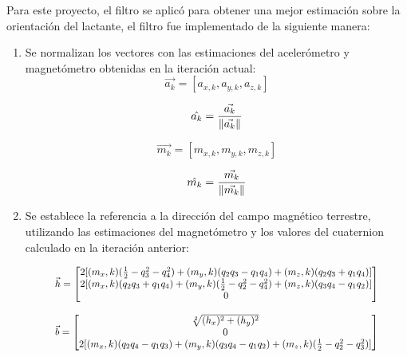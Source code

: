     Para este proyecto, el filtro se aplicó para obtener una mejor estimación sobre la orientación del lactante, el filtro fue implementado de la siguiente manera:

    \begin{enumerate}
        \item Se normalizan los vectores con las estimaciones del acelerómetro y magnetómetro obtenidas en la iteración actual:
        \begin{equation}
             \vec{a_k} = [a_{x,k}, a_{y,k}, a_{z,k}]  
        \end{equation}

        \begin{equation}
            \hat{a_k} = \frac{\vec{a_k}}{\lVert\vec{a_k}\rVert}  
        \end{equation}

        \begin{equation}
            \vec{m_k} = [m_{x,k}, m_{y,k}, m_{z,k}] 
        \end{equation}

        \begin{equation}
            \hat{m_k} = \frac{\vec{m_k}}{\lVert\vec{m_k}\rVert} 
        \end{equation}
            
        
        \item Se establece la referencia a la dirección del campo magnético terrestre, utilizando las estimaciones del magnetómetro y los valores del cuaternion calculado en la iteración anterior:
        
        \begin{equation}
            \resizebox{0.84\hsize}{!}{$
            \vec{h} = 
                \begin{bmatrix}
                    2[(m_x,k)(\frac{1}{2} - q^2_3 - q^2_4 ) + (m_y,k)(q_2q_3 - q_1q_4) + (m_z,k)(q_2q_3 + q_1q_4)] \\
                    2[(m_x,k)(q_2q_3 + q_1q_4) + (m_y,k)(\frac{1}{2} - q^2_2 - q^2_4 ) + (m_z,k)(q_3q_4 - q_1q_2)] \\
                    0 
                \end{bmatrix} 
            $}    
        \end{equation}
        
        
        \begin{equation}
        \resizebox{0.84\hsize}{!}{$
            \vec{b} = 
                \begin{bmatrix}
                    \sqrt[2]{(h_x)^2+(h_y)^2}  \\
                    0 \\
                    2[(m_x,k)(q_2q_4 - q_1q_3) + (m_y,k)(q_3q_4 - q_1q_2) + (m_z,k)(\frac{1}{2} - q^2_2 - q^2_3 )] 
                \end{bmatrix} 
            $}
        \end{equation}
            

\end{enumerate}
